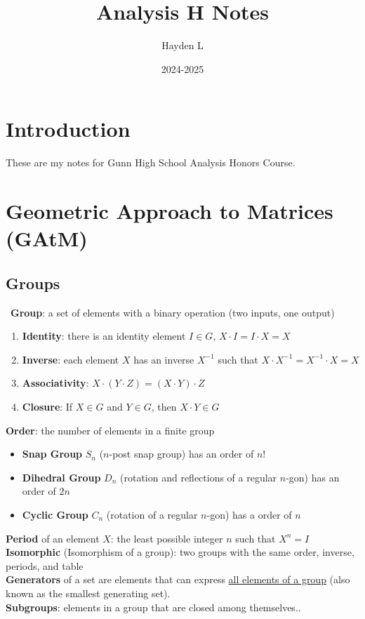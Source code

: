 \documentclass[12pt, letterpaper]{article}
\title{Analysis H Notes}
\author{Hayden L}
\date{2024-2025}
\begin{document}
\maketitle
\pagebreak

\section{Introduction}
These are my notes for Gunn High School Analysis Honors Course.
\pagebreak

\section{Geometric Approach to Matrices (GAtM)}
\subsection{Groups}\
\textbf{Group}: a set of elements with a binary operation (two inputs, one output)
\begin{enumerate}
    \item \textbf{Identity}: there is an identity element \(I \in G\), \(X \cdot I = I \cdot X = X\)
    \item \textbf{Inverse}: each element \(X\) has an inverse \(X^{-1}\) such that \(X \cdot X^{-1} = X^{-1} \cdot X = X\)
    \item \textbf{Associativity}: \(X \cdot (Y \cdot Z) = (X \cdot Y) \cdot Z\)
    \item \textbf{Closure}: If \(X \in G\) and \(Y \in G\), then \(X \cdot Y \in G\)
\end{enumerate}
\textbf{Order}: the number of elements in a finite group
\begin{itemize}
    \item \textbf{Snap Group} \(S_n\) (\(n\)-post snap group) has an order of \(n!\)
    \item \textbf{Dihedral Group} \(D_n\) (rotation and reflections of a regular \(n\)-gon) has an order of \(2n\)
    \item \textbf{Cyclic Group} \(C_n\) (rotation of a regular \(n\)-gon) has a order of \(n\)
\end{itemize}
\textbf{Period} of an element \(X\): the least possible integer \(n\) such that \(X^n = I\)\\
\textbf{Isomorphic} (Isomorphism of a group): two groups with the same order, inverse, periods, and table\\
\textbf{Generators} of a set are elements that can express \underline{all elements of a group} (also known as the smallest generating set).\\
\textbf{Subgroups}: elements in a group that are closed among themselves..
\end{document}
